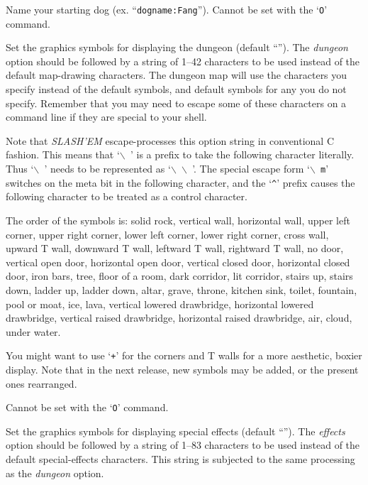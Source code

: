 \item[\ib{dogname}]
Name your starting dog (ex. ``{\tt dogname:Fang}'').
Cannot be set with the `{\tt O}' command.

\item[\ib{dungeon}]
Set the graphics symbols for displaying the dungeon
(default \relax{}``'').
The
{\it dungeon\/} 
option should be followed by a string of 1--42
characters to be used instead of the default map-drawing characters.
The dungeon map will use the characters you specify instead of the
default symbols, and default symbols for any you do not specify.
Remember that you may need to escape some of these characters
on a command line if they are special to your shell.

Note that {\it SLASH'EM\/} escape-processes this option string in conventional C
fashion.  This means that `{\tt $\backslash$ }' is a prefix to take the following
character literally.  Thus `{\tt $\backslash$ }' needs to be represented as `{\tt $\backslash$ $\backslash$ }'.
The special escape
form `{\tt $\backslash$ m}' switches on the meta bit in the following character, and the `{\tt \^{}}'
prefix causes the following character to be treated as a control
character.

The order of the symbols is:  solid rock, vertical wall, horizontal
wall, upper left corner, upper right corner, lower left corner, lower
right corner, cross wall, upward T wall, downward T wall, leftward T
wall, rightward T wall, no door, vertical open door, horizontal open
door, vertical closed door, horizontal closed door, iron bars, tree,
floor of a room, dark corridor, lit corridor, stairs up, stairs down,
ladder up, ladder down, altar, grave, throne, kitchen sink, toilet,
fountain, pool or moat,
ice, lava, vertical lowered drawbridge, horizontal lowered drawbridge,
vertical raised drawbridge, horizontal raised drawbridge, air, cloud,
under water.

You might want to use `{\tt +}' for the corners and T walls for a more
aesthetic, boxier display.  Note that in the next release, new symbols
may be added, or the present ones rearranged.

Cannot be set with the `{\tt O}' command.

\item[\ib{effects}]
Set the graphics symbols for displaying special effects
(default \relax{}``'').
The
{\it effects\/} 
option should be followed by a string of 1--83
characters to be used instead of the default special-effects characters.
This string is subjected to the same processing as the
{\it dungeon\/} 
option.

